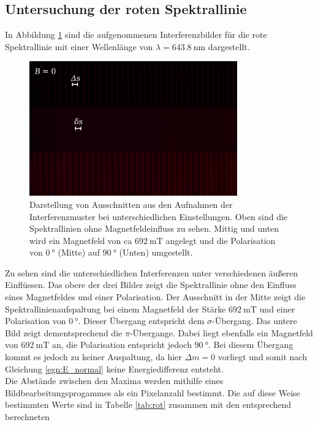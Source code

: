  \subsection{Untersuchung der roten Spektrallinie}
 In Abbildung \ref{fig:rot} sind die aufgenommenen Interferenzbilder für die rote Spektrallinie
 mit einer Wellenlänge von $\lambda = \SI{643.8}{\nano\meter}$ dargestellt.
 \begin{figure}[H]
     \centering
     \includegraphics[width=0.8\textwidth]{images/zebraplot_rot.jpg}
     \caption{Darstellung von Ausschnitten aus den Aufnahmen der Interferenzmuster bei unterschiedlichen
     Einstellungen. Oben sind die Spektrallinien ohne Magnetfeldeinfluss zu sehen. Mittig und unten
     wird ein Magnetfeld von ca $\SI{692}{\milli\tesla}$ angelegt und die Polarisation von $\SI{0}{\degree}$ (Mitte)
     auf $\SI{90}{\degree}$ (Unten) umgestellt.}
     \label{fig:rot}
 \end{figure} \noindent
 Zu sehen sind die unterschiedlichen Interferenzen unter verschiedenen äußeren Einflüssen. Das obere der drei
 Bilder zeigt die Spektrallinie ohne den Einfluss eines Magnetfeldes und einer Polarisation. Der Ausschnitt in
 der Mitte zeigt die Spektrallinienaufspaltung bei einem Magnetfeld der Stärke $\SI{692}{\milli\tesla}$ und
 einer Polarisation von $\SI{0}{\degree}$. Dieser Übergang entspricht dem $\sigma$-Übergang. Das untere
 Bild zeigt dementsprechend die $\pi$-Übergange. Dabei liegt ebenfalls ein Magnetfeld von $\SI{692}{\milli\tesla}$
 an, die Polarisation entspricht jedoch $\SI{90}{\degree}$. Bei diesem Übergang kommt es jedoch zu keiner
 Auspaltung, da hier $\Delta m = 0$ vorliegt und somit nach Gleichung \ref{egn:E_normal} keine Energiedifferenz
 entsteht. \\
 Die Abstände zwischen den Maxima werden mithilfe eines Bildbearbeitungsprogammes als ein Pixelanzahl bestimmt.
 Die auf diese Weise bestimmten Werte sind in Tabelle \ref{tab:rot} zusammen mit den entsprechend berechneten
